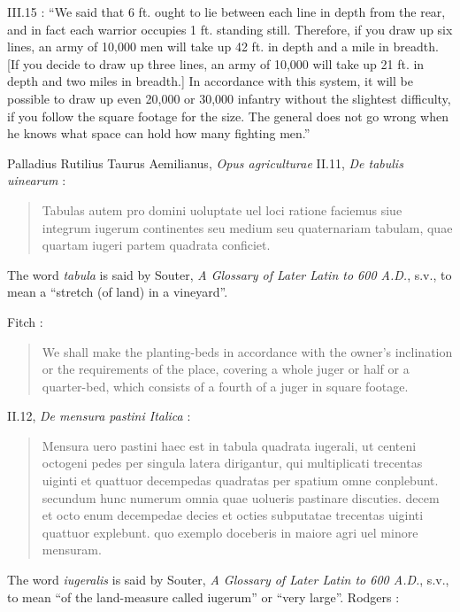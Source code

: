 \documentclass{article}
\theoremstyle{definition}
\begin{document}
III.15 \cite[p.~97]{vegetius}: ``We said that 6 ft. ought to lie between each line in depth from the rear, and in fact each
warrior occupies 1 ft. standing still. Therefore, if you draw up six lines, an army of 10,000 men will take up 42 ft.
in depth and a mile in breadth. [If you decide to draw up three lines, an army of 10,000 will take up 21 ft. in depth and two
miles in breadth.] In accordance with this system, it will be possible to draw up even 20,000 or 30,000 infantry without the slightest
difficulty, if you follow the square footage for the size. The general does not go wrong when he knows what space
can hold how many fighting men.'' 

Palladius Rutilius Taurus Aemilianus, {\em Opus agriculturae} II.11, {\em De tabulis uinearum} \cite[p.~54]{palladii}:

\begin{quote}
Tabulas autem pro domini uoluptate uel loci ratione
faciemus siue integrum iugerum continentes seu medium
seu quaternariam tabulam, quae quartam iugeri partem
quadrata conficiet.
\end{quote}

The word {\em tabula} is said by Souter, {\em A Glossary of Later Latin to 600 A.D.}, s.v., to mean a ``stretch (of land) in a vineyard''.

Fitch \cite[p.~75]{fitch}:

\begin{quote}
We shall make the planting-beds in accordance with the owner's inclination or the requirements of the place, covering a whole juger or half or a quarter-bed, which consists of a fourth of a juger in square footage. 
\end{quote}

II.12, {\em De mensura pastini Italica} \cite[p.~55]{palladii}:

\begin{quote}
Mensura uero pastini haec est in tabula quadrata iugerali,
ut centeni octogeni pedes per singula latera dirigantur,
qui multiplicati trecentas uiginti et quattuor decempedas
quadratas per spatium omne conplebunt.
secundum hunc numerum omnia quae uolueris pastinare discuties.
decem et octo enum decempedae decies et octies subputatae
trecentas uiginti quattuor explebunt.
quo exemplo doceberis in maiore agri uel minore mensuram. 
\end{quote}

The word {\em iugeralis} is said by Souter, {\em A Glossary of Later Latin to 600 A.D.}, s.v., to mean ``of the land-measure called iugerum'' or ``very large''. 
Rodgers \cite[p.~96]{palladius}:
\end{document}
